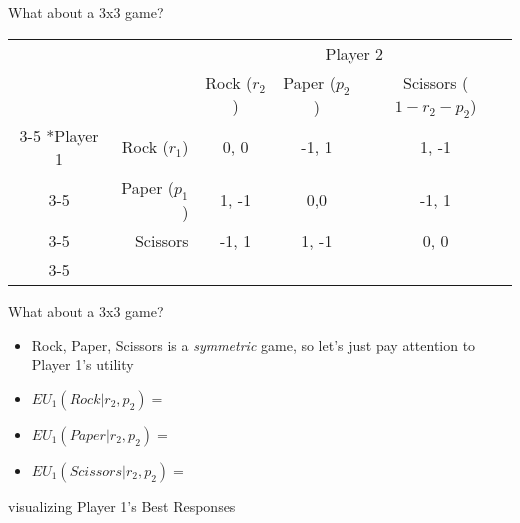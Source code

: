 \begin{frame}{What about a 3x3 game?}
\begin{table}[h]
\centering
  \begin{tabular}{cr|c|c|c|}
	& \multicolumn{1}{c}{} & \multicolumn{3}{c}{Player 2}\\
    & \multicolumn{1}{c}{} & Rock ($r_2$) & Paper ($p_2$) & Scissors ($1-r_2-p_2$) \\\cline{3-5}
    \multirow{3}*{Player 1}  & Rock ($r_1$) & 0, 0 & -1, 1 & 1, -1 \\\cline{3-5}
    & Paper ($p_1$) & 1, -1 & 0,0 & -1, 1 \\\cline{3-5}
    & Scissors  & -1, 1 & 1, -1 & 0, 0 \\\cline{3-5}
\end{tabular}
\end{table}
\end{frame}

\begin{frame}{What about a 3x3 game?}
  \begin{itemize}
    \item Rock, Paper, Scissors is a \textit{symmetric} game, so let's just pay attention to Player 1's utility 

    \item $EU_1(Rock | r_2, p_2) = $

    \item $EU_1(Paper | r_2, p_2) = $

    \item $EU_1(Scissors | r_2, p_2) = $
  \end{itemize}
  
\end{frame}

\begin{frame}{visualizing Player 1's Best Responses}
  \begin{center}
  \end{center}
\end{frame}

